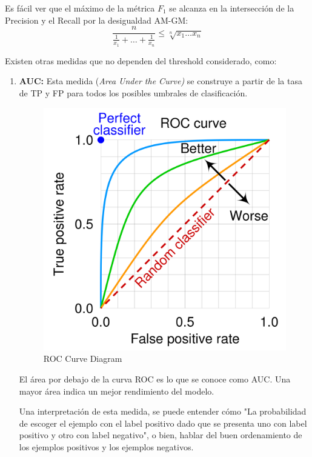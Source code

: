 Es fácil ver que el máximo de la métrica $F_{1}$ se alcanza en la intersección de la Precision y el Recall por la desigualdad AM-GM:
$$ 
\frac{n}{\frac{1}{x_1} + \dots + \frac{1}{x_n}} \leq \sqrt[n]{x_1 \dots x_n}
$$

Existen otras medidas que no dependen del threshold considerado, como: 

\begin{enumerate}
    \item \textbf{AUC: } Esta medida (\textit{Area Under the Curve)} se construye a partir de la tasa de TP y FP para todos los posibles umbrales de clasificación. 

    \begin{figure}[H]
    \center
    \includegraphics[scale=0.1]{notebooks/Basic/img/roc_curve_diagram.png}
    \caption{ROC Curve Diagram}
    \end{figure}

    El área por debajo de la curva ROC es lo que se conoce como AUC. Una mayor área indica un mejor rendimiento del modelo. 

    Una interpretación de esta medida, se puede entender cómo "La probabilidad de escoger el ejemplo con el label positivo dado que se presenta uno con label positivo y otro con label negativo", o bien, hablar del buen ordenamiento de los ejemplos positivos y los ejemplos negativos. 
    

\end{enumerate}
